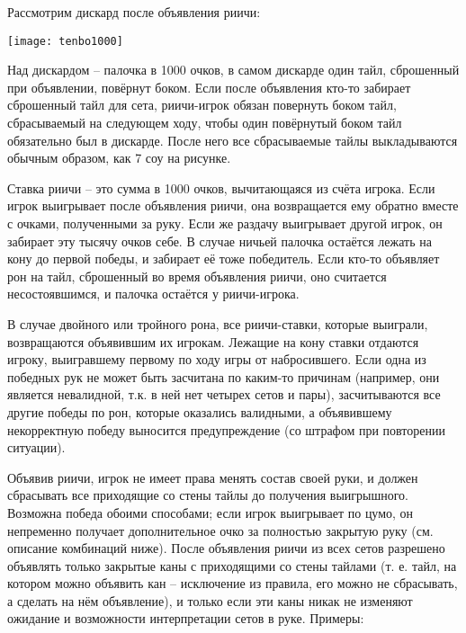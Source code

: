 Рассмотрим дискард после объявления риичи:

\hspace{1.3cm} \texttt{[image: tenbo1000]}



Над дискардом – палочка в 1000 очков, в самом дискарде один тайл, сброшенный при объявлении, повёрнут боком. Если после объявления кто-то забирает сброшенный тайл для сета, риичи-игрок обязан повернуть боком тайл, сбрасываемый на следующем ходу, чтобы один повёрнутый боком тайл обязательно был в дискарде. После него все сбрасываемые тайлы выкладываются обычным образом, как 7 соу на рисунке.

Ставка риичи – это сумма в 1000 очков, вычитающаяся из счёта игрока. Если игрок выигрывает после объявления риичи, она возвращается ему обратно вместе с очками, полученными за руку. Если же раздачу выигрывает другой игрок, он забирает эту тысячу очков себе. В случае ничьей палочка остаётся лежать на кону до первой победы, и забирает её тоже победитель. Если кто-то объявляет рон на тайл, сброшенный во время объявления риичи, оно считается несостоявшимся, и палочка остаётся у риичи-игрока.

В случае двойного или тройного рона, все риичи-ставки, которые выиграли, возвращаются объявившим их игрокам. Лежащие на кону ставки отдаются игроку, выигравшему первому по ходу игры от набросившего. Если одна из победных рук не может быть засчитана по каким-то причинам (например, они является невалидной, т.к. в ней нет четырех сетов и пары), засчитываются все другие победы по рон, которые оказались валидными, а объявившему некорректную победу выносится предупреждение (со штрафом при повторении ситуации).

Объявив риичи, игрок не имеет права менять состав своей руки, и должен сбрасывать все приходящие со стены тайлы до получения выигрышного. Возможна победа обоими способами; если игрок выигрывает по цумо, он непременно получает дополнительное очко за полностью закрытую руку (см. описание комбинаций ниже). После объявления риичи из всех сетов разрешено объявлять только закрытые каны с приходящими со стены тайлами (т. е. тайл, на котором можно объявить кан – исключение из правила, его можно не сбрасывать, а сделать на нём объявление), и только если эти каны никак не изменяют ожидание и возможности интерпретации сетов в руке. Примеры:


